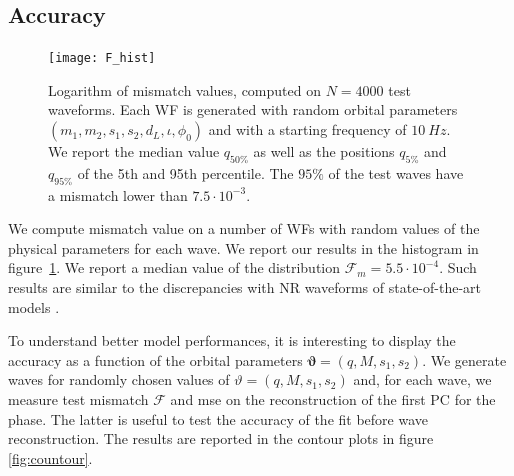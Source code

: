 \subsection{Accuracy}
\begin{figure}
	\centering
    \texttt{[image: F\_hist]}
	\caption{Logarithm of mismatch values, computed on $N=4000$ test waveforms. 
	Each WF is generated with random orbital parameters $(m_1,m_2, s_1, s_2, d_L, \iota, \phi_0)$ and with a starting frequency of $\SI{10}{Hz}$.
We report the median value $q_{50\%}$ as well as the positions $q_{5\%}$ and $q_{95\%}$ of the 5th and 95th percentile.
The $95\%$ of the test waves have a mismatch lower than $7.5 \cdot 10^{-3}$.
}
	\label{fig:F_hist}
\end{figure}
We compute mismatch value on a number of WFs with random values of the physical parameters for each wave.
We report our results in the histogram in figure~\ref{fig:F_hist}.
We report a median value of the distribution $\mathcal{F}_m = 5.5 \cdot {10^{-4}}$. Such results are similar to the discrepancies with NR waveforms of state-of-the-art models \cite{Bohe:2016gbl, Nagar:2018zoe, Nagar:2020pcj}.

To understand better model performances, it is interesting to display the accuracy as a function of the orbital parameters $\boldsymbol{\vartheta} = (q,M,s_1,s_2)$.
We generate waves for randomly chosen values of $\vartheta = (q, M, s_1, s_2)$ and, for each wave, we measure test mismatch $\mathcal{F}$ and mse on the reconstruction of the first PC for the phase.
The latter is useful to test the accuracy of the fit before wave reconstruction.
The results are reported in the contour plots in figure \ref{fig:countour}.


